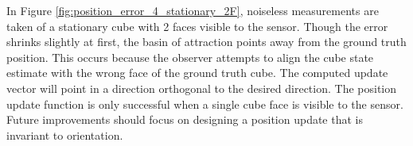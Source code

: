 In Figure \ref{fig:position_error_4_stationary_2F}, noiseless measurements are taken of a stationary cube with 2 faces visible to the sensor. Though the error shrinks slightly at first, the basin of attraction points away from the ground truth position. 
This occurs because the observer attempts to align the cube state estimate with the wrong face of the ground truth cube. The computed update vector will point in a direction orthogonal to the desired direction. 
The position update function is only successful when a single cube face is visible to the sensor. Future improvements should focus on designing a position update that is invariant to orientation.

\begin{figure}
\centering
\end{figure}

